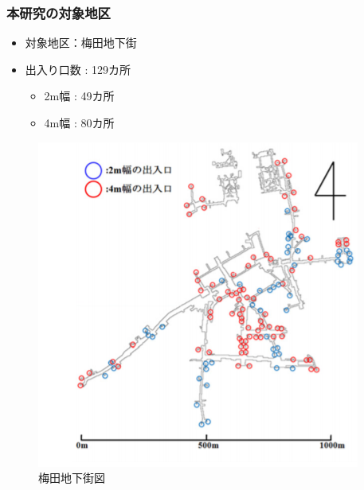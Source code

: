 \documentclass[12pt,dvipdfmx]{beamer}
\begin{document}
    {
      \frametitle{本研究の対象地区}

      \begin{minipage}{0.4\columnwidth}
        \centering
      \begin{itemize}
      \item 対象地区：梅田地下街
        \medskip

      \item 出入り口数 : 129カ所
        \begin{itemize}
        \item 2m幅 : 49カ所
        \item 4m幅 : 80カ所
        \end{itemize}
      \end{itemize}
      \end{minipage}
      \begin{minipage}{0.4\columnwidth}
        \centering
      \begin{figure}[H]
        \includegraphics[scale=0.72]{umedamap3.pdf}
          \caption{梅田地下街図}
      \end{figure}
      \end{minipage}

    }
\frame
\end{document}
